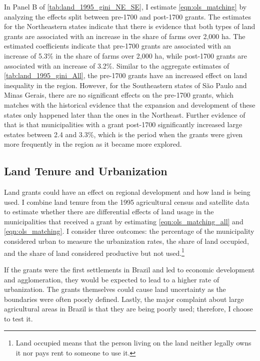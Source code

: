 \documentclass[11pt]{article}
\begin{document}
In Panel B of \autoref{tab:land_1995_gini_NE_SE}, I estimate \autoref{eqn:ols_matching} by analyzing the effects split between pre-1700 and post-1700 grants.
The estimates for the Northeastern states indicate that there is evidence that both types of land grants are associated with an increase in the share of farms over 2,000 ha. 
The estimated coefficients indicate that pre-1700 grants are associated with an increase of 5.3\% in the share of farms over 2,000 ha, while post-1700 grants are associated with an increase of 3.2\%. 
Similar to the aggregate estimates of \autoref{tab:land_1995_gini_All}, the pre-1700 grants have an increased effect on land inequality in the region.
However, for the Southeastern states of São Paulo and Minas Gerais, there are no significant effects on the pre-1700 grants, which matches with the historical evidence that the expansion and development of these states only happened later than the ones in the Northeast.
Further evidence of that is that municipalities with a grant post-1700 significantly increased large estates between 2.4 and 3.3\%, which is the period when the grants were given more frequently in the region as it became more explored. 

\subsection{Land Tenure and Urbanization}

Land grants could have an effect on regional development and how land is being used. 
I combine land tenure from the 1995 agricultural census and satellite data to estimate whether there are differential effects of land usage in the municipalities that received a grant by estimating \autoref{eqn:ols_matching_all} and \autoref{eqn:ols_matching}. 
I consider three outcomes: the percentage of the municipality considered urban to measure the urbanization rates, the share of land occupied, and the share of land considered productive but not used.\footnote{Land occupied means that the person living on the land neither legally owns it nor pays rent to someone to use it.}

If the grants were the first settlements in Brazil and led to economic development and agglomeration, they would be expected to lead to a higher rate of urbanization.
The grants themselves could cause land uncertainty as the boundaries were often poorly defined.
Lastly, the major complaint about large agricultural areas in Brazil is that they are being poorly used; therefore, I choose to test it.
\end{document}

